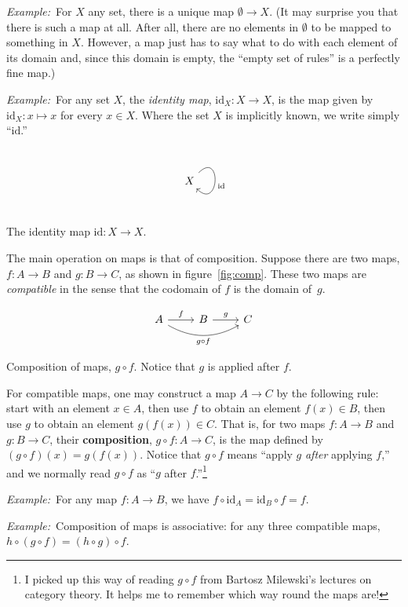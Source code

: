 \documentclass[12pt, a4paper]{article}
\newcommand{\defn}[1]{\textbf{#1}}
\newcommand{\eg}{\emph{Example:}\relax}
\newcommand{\id}{\text{id}}
\begin{document}
\eg\ For $X$ any set, there is a unique map $\emptyset \to X$. (It may surprise
you that there is such a map at all. After all, there are no elements
in $\emptyset$ to be mapped to something in $X$. However, a map just has to
say what to do with each element of its domain and, since this domain
is empty, the “empty set of rules” is a perfectly fine map.)

\eg\ For any set $X$, the \emph{identity map}, $\id_X\colon X \to X$, is
the map given by $\id_X\colon x \mapsto x$ for every $x\in X$. Where the set
$X$ is implicitly known, we write simply “$\id$.”
\begin{sidefigure}
\[\begin{tikzcd}
    X \arrow[loop right, out=45, in=-45, distance=3em, "\id"]
  \end{tikzcd}\]
  \caption{The identity map $\id\colon X\to X$.}
\end{sidefigure}

The main operation on maps is that of composition. Suppose there are
two maps, $f\colon A\to B$ and $g\colon B\to C$, as shown in
figure~\ref{fig:comp}. These two maps are \emph{compatible} in the
sense that the codomain of $f$ is the domain of~$g$.
\begin{sidefigure}
  \[
  \begin{tikzcd}
    A \arrow [rr, bend right, "g \circ f"' ] \arrow[r, "f"] & B \arrow[r, "g"] & C 
  \end{tikzcd}
  \]
  \caption{Composition of maps, $g \circ f$. Notice that $g$ is applied
    after $f$.\label{fig:comp}}
\end{sidefigure}
For compatible maps, one may construct a map $A\to C$ by the following
rule: start with an element $x\in A$, then use $f$ to obtain an element
$f(x)\in B$, then use $g$ to obtain an element $g(f(x))\in C$. That is,
for two maps $f\colon A \to B$ and $g\colon B \to C$, their
\defn{composition}, $g\circ f\colon A \to C$, is the map defined by $(g\circ
f)(x) = g(f(x))$. Notice that $g\circ f$ means “apply $g$ \emph{after}
applying $f$,” and we normally read $g\circ f$ as “$g$ after
$f$.”\footnote{I picked up this way of reading $g\circ f$ from Bartosz
  Milewski's lectures on category theory. It helps me to remember
  which way round the maps are!}
  
\eg\ For any map $f\colon A\to B$, we have $f\circ\id_A = \id_B\circ f = f$.

\eg\ Composition of maps is associative: for any three compatible
maps, $h\circ (g\circ f) = (h\circ g)\circ f$.
\end{document}
